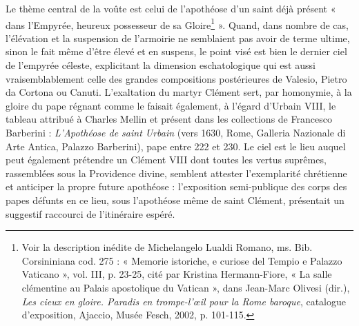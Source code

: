 \documentclass[12pt,twoside,openany]{book}
\begin{document}
Le thème central de la voûte est celui de l’apothéose d’un saint déjà présent « dans l’Empyrée, heureux possesseur de sa Gloire\footnote{Voir la description inédite de Michelangelo Lualdi Romano, ms. Bib. Corsininiana cod. 275 : « Memorie istoriche, e curiose del Tempio e Palazzo Vaticano », vol. III, p. 23-25, cité par Kristina Hermann-Fiore, « La salle clémentine au Palais apostolique du Vatican », dans Jean-Marc Olivesi (dir.), \textit{Les cieux en gloire. Paradis en trompe-l’œil pour la Rome baroque}, catalogue d’exposition, Ajaccio, Musée Fesch, 2002, p. 101-115.} ». Quand, dans nombre de cas, l’élévation et la suspension de l’armoirie ne semblaient pas avoir de terme ultime, sinon le fait même d’être élevé et en suspens, le point visé est bien le dernier ciel de l’empyrée céleste, explicitant la dimension eschatologique qui est aussi vraisemblablement celle des grandes compositions postérieures de Valesio, Pietro da Cortona ou Canuti. L’exaltation du martyr Clément sert, par homonymie, à la gloire du pape régnant comme le faisait également, à l’égard d’Urbain VIII, le tableau attribué à Charles Mellin et présent dans les collections de Francesco Barberini : \textit{L’Apothéose de saint Urbain }(vers 1630, Rome, Galleria Nazionale di Arte Antica, Palazzo Barberini), pape entre 222 et 230. Le ciel est le lieu auquel peut également prétendre un Clément VIII dont toutes les vertus suprêmes, rassemblées sous la Providence divine, semblent attester l’exemplarité chrétienne et anticiper la propre future apothéose : l’exposition semi-publique des corps des papes défunts en ce lieu, sous l’apothéose même de saint Clément, présentait un suggestif raccourci de l’itinéraire espéré.
\end{document}

